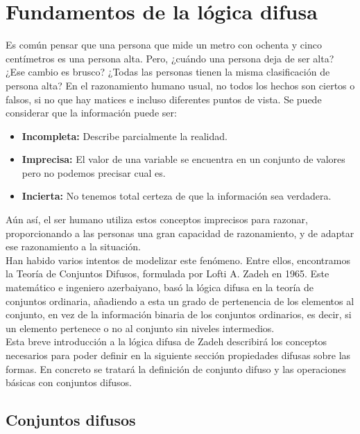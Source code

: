 \section{Fundamentos de la lógica difusa}
Es común pensar que una persona que mide un metro con ochenta y cinco centímetros es una persona alta. Pero, ¿cuándo una persona deja de ser alta? ¿Ese cambio es brusco? ¿Todas las personas tienen la misma clasificación de persona alta? En el razonamiento humano usual, no todos los hechos son ciertos o falsos, si no que hay matices e incluso diferentes puntos de vista. Se puede considerar que la información puede ser:

\begin{itemize}
\item \textbf{Incompleta:} Describe parcialmente la realidad.
\item \textbf{Imprecisa:} El valor de una variable se encuentra en un conjunto de valores pero no podemos precisar cual es.
\item \textbf{Incierta:} No tenemos total certeza de que la información sea verdadera.
\end{itemize}

Aún así, el ser humano utiliza estos conceptos imprecisos para razonar, proporcionando a las personas una gran capacidad de razonamiento, y de adaptar ese razonamiento a la situación.\\

Han habido varios intentos de modelizar este fenómeno. Entre ellos, encontramos la Teoría de Conjuntos Difusos, formulada por Lofti A. Zadeh en 1965\cite{Zadeh-Fuzzy-1965}. Este matemático e ingeniero azerbaiyano, basó la lógica difusa en la teoría de conjuntos ordinaria, añadiendo a esta un grado de pertenencia de los elementos al conjunto, en vez de la información binaria de los conjuntos ordinarios, es decir, si un elemento pertenece o no al conjunto sin niveles intermedios.\\

Esta breve introducción a la lógica difusa de Zadeh describirá los conceptos necesarios para poder definir en la siguiente sección propiedades difusas sobre las formas. En concreto se tratará la definición de conjunto difuso y las operaciones básicas con conjuntos difusos.\\

\subsection{Conjuntos difusos}


